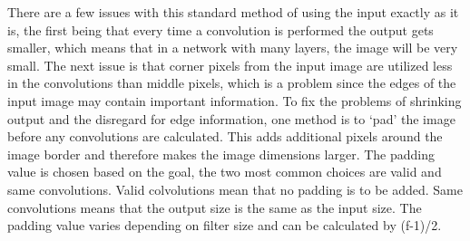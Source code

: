 \documentclass[10pt,twocolumn]{article}
\begin{document}
There are a few issues with this standard method of using the input exactly as it is, the first being that every time a convolution is performed the output gets smaller, which means that in a network with many layers, the image will be very small. The next issue is that corner pixels from the input image are utilized less in the convolutions than middle pixels, which is a problem since the edges of the input image may contain important information. To fix the problems of shrinking output and the disregard for edge information, one method is to ‘pad’ the image before any convolutions are calculated. This adds additional pixels around the image border and therefore makes the image dimensions larger. The padding value is chosen based on the goal, the two most common choices are valid and same convolutions. Valid colvolutions mean that no padding is to be added. Same convolutions means that the output size is the same as the input size. The padding value varies depending on filter size and can be calculated by (f-1)/2. 
\end{document}
